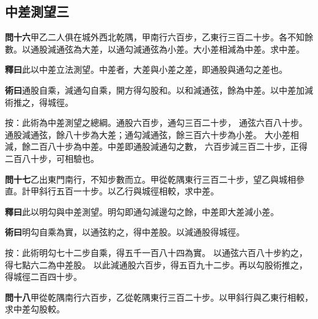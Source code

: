 \documentclass[12pt,a4paper]{article}
\newcommand{\Section}[1]{\subsection*{#1}}
\begin{document}
\Section{中差測望三}

\noindent\textbf{問十六}\quad 甲乙二人俱在城外西北乾隅，甲南行六百步，乙東行三百二十步。各不知餘數。以通股減通弦為大差，以通勾減通弦為小差。大小差相減為中差。求中差。

\vspace{0.3em}

\noindent\textbf{釋曰}\quad 此以中差立法測望。中差者，大差與小差之差，即通股與通勾之差也。

\vspace{0.3em}

\noindent\textbf{術曰}\quad 通股自乘，減通勾自乘，開方得勾股和。以和減通弦，餘為中差。以中差加減術推之，得城徑。

\vspace{0.3em}

\noindent
按：此術為中差測望之總綱。通股六百步，通勾三百二十步，
通弦六百八十步。通股減通弦，餘八十步為大差；通勾減通弦，餘三百六十步為小差。
大小差相減，餘二百八十步為中差。中差即通股減通勾之數，
六百步減三百二十步，正得二百八十步，可相驗也。

\vspace{0.5em}

\noindent\textbf{問十七}\quad 乙出東門南行，不知步數而立。甲從乾隅東行三百二十步，望乙與城相參直。計甲斜行五百一十步。以乙行與城徑相較，求中差。

\vspace{0.3em}

\noindent\textbf{釋曰}\quad 此以明勾與中差測望。明勾即通勾減邊勾之餘，中差即大差減小差。

\vspace{0.3em}

\noindent\textbf{術曰}\quad 明勾自乘為實，以通弦約之，得中差股。以減通股得城徑。

\vspace{0.3em}

\noindent
按：此術明勾七十二步自乘，得五千一百八十四為實。
以通弦六百八十步約之，得七點六二為中差股。
以此減通股六百步，得五百九十二步。再以勾股術推之，得城徑二百四十步。

\vspace{0.5em}

\noindent\textbf{問十八}\quad 甲從乾隅南行六百步，乙從乾隅東行三百二十步。以甲斜行與乙東行相較，求中差勾股較。

\vspace{0.3em}
\end{document}

